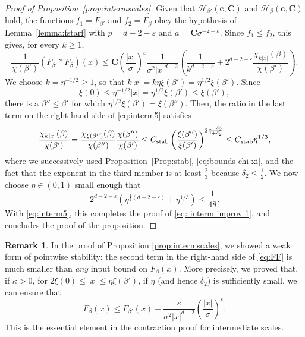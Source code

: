 \documentclass[11pt,a4paper]{article}
\numberwithin{equation}{section}
\theoremstyle{plain}
\theoremstyle{definition}
\newtheorem{Rem}[Thm]{Remark}
\newcommand\1{\mathds{1}}
\newcommand\bfc{\mathbf{c}}
\newcommand\bfC{\mathbf{C}}
\newcommand{\Cstab}{C_{\textup{stab}}}
\begin{document}
\begin{proof}[Proof of Proposition~\textup{\ref{prop:intermscales}}]
Given that $\mathcal H_{\beta'}(\bfc,\bfC)$ and $\mathcal H_{\beta}(\bfc,\bfC)$ hold, the functions
$f_1=F_{\beta'}$ and $f_2=F_{\beta}$ obey the hypothesis of
Lemma~\ref{lemma:fstarf} with $p=d-2-\varepsilon$
and $a= \bfC\sigma^{-2-\varepsilon}$.
Since
$f_1 \le f_2$, this gives, for every $k \ge 1$,
\begin{equation}
\label{eq:interm5}
    \frac{1}{\chi(\beta')}
    (F_{\beta'}*F_\beta)(x)
    \leq
    \bfC \left(\frac{|x|}{\sigma}\right)^\varepsilon
    \frac{1}{\sigma^2 |x|^{d-2}}
    \left( \frac{1}{k^{d-2-\varepsilon}}  + 2^{d-2-\varepsilon} \frac{\chi_{k|x|}(\beta)}{\chi(\beta')} \right)
    .
\end{equation}
We choose $k=\eta^{-1/2}\geq 1$,
so that $k|x|=k\eta\xi(\beta')=\eta^{1/2}\xi(\beta')$.  Since
\begin{equation}
\xi(0)  \le \eta^{-1/2}|x| =
\eta^{1/2}\xi(\beta')    \le \xi(\beta'),
\end{equation}
there is a
$\beta''\le \beta'$ for which $\eta^{1/2}\xi(\beta') = \xi(\beta'')$.
Then, the ratio in the last term on the right-hand side of \eqref{eq:interm5} satisfies
\begin{equation}
    \frac{\chi_{k|x|}(\beta)}{\chi(\beta')}
    =
    \frac{\chi_{\xi(\beta'')}(\beta)}{\chi(\beta'')}
     \frac{\chi(\beta'')}{\chi(\beta')}
     \le
     \Cstab
     \left(\frac{\xi(\beta'')}{\xi(\beta')} \right)^{2\frac{1-\delta_2}{1+\delta_2}}
     \le
     \Cstab  \eta^{1/3},
\end{equation}
where we successively used Proposition~\ref{Prop:stab},
\eqref{eq:bounds chi xi}, and the fact that the exponent in the third member is at least $\frac 23$ because $\delta_2 \le \frac 12$.
We now choose $\eta\in(0,1)$ small enough that
\begin{equation}
    2^{d-2-\varepsilon}
    (\eta^{\frac 12(d-2-\varepsilon)} + \eta^{1/3})
    \le \frac{1}{48}.
\end{equation}
With \eqref{eq:interm5}, this completes the proof of \eqref{eq: interm improv 1}, and concludes the proof of the proposition.
\end{proof}

\begin{Rem} In the proof of Proposition \ref{prop:intermscales}, we showed a weak form of pointwise stability: the second term in the right-hand side of \eqref{eq:FF} is much smaller than \emph{any} input bound on $F_\beta(x)$. More precisely, we proved that, if $\kappa>0$, for
$2\xi(0) \le |x|\le \eta \xi(\beta')$, if $\eta$ (and hence $\delta_2$) is sufficiently small, we can ensure that
\begin{equation}
	F_\beta(x)\leq F_{\beta'}(x)
    +\frac{\kappa}{\sigma^2|x|^{d-2}}
    \left(\frac{|x|}{\sigma}\right)^{\varepsilon}.
\end{equation}
This is the essential element in the contraction proof for intermediate scales.
\end{Rem}
\end{document}
